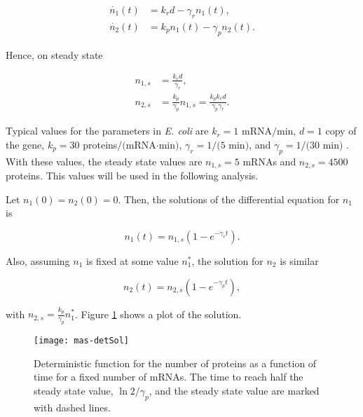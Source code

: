 \begin{equation}
  \label{eq:mas-simple_det_1}
  \begin{split}
    \dot{n_1}(t) &= k_rd-\gamma_rn_1(t),\\
    \dot{n_2}(t) &= k_pn_1(t)-\gamma_pn_2(t).
  \end{split}
\end{equation}

Hence, on steady state

\begin{equation}
  \label{eq:mas-simple_ss_1}
  \begin{split}
    n_{1,s} &= \frac{k_rd}{\gamma_r}, \\
    n_{2,s} &= \frac{k_p}{\gamma_p} n_{1,s} = \frac{k_pk_rd}{\gamma_p\gamma_r}.
  \end{split}
\end{equation}

Typical values for the parameters in \textit{E. coli} are $k_r = 1$ mRNA$/$min, $d=1$ copy of the gene, $k_p = 30$ proteins$/($mRNA$\cdot$min$)$, $\gamma_r = 1/(5$ min$)$, and $\gamma_p = 1/(30$ min$)$ \cite{alon06}. With these values, the steady state values are $n_{1,s}=5$ mRNAs and $n_{2,s}=4500$ proteins. This values will be used in the following analysis.

Let $n_1(0) = n_2(0) = 0$. Then, the solutions of the differential equation for $n_1$ is

\begin{equation*}
  n_1(t) = n_{1,s}\left(1-e^{-\gamma_rt}\right).
\end{equation*}

Also, assuming $n_1$ is fixed at some value $n_1^*$, the solution for $n_2$ is similar

\begin{equation*}
  n_2(t) = n_{2,s}\left(1-e^{-\gamma_pt}\right),
\end{equation*}

with $n_{2,s}=\frac{k_p}{\gamma_p}n_1^*$. Figure \ref{fig:mas-detSol} shows a plot of the solution.

\begin{figure}[H]
  \centering
  \texttt{[image: mas-detSol]}
  \caption[Deterministic equation for the number of proteins in a single gene]{\label{fig:mas-detSol} Deterministic function for the number of proteins as a function of time for a fixed number of mRNAs. The time to reach half the steady state value, $\ln 2/\gamma_p$, and the steady state value are marked with dashed lines.}
\end{figure}

